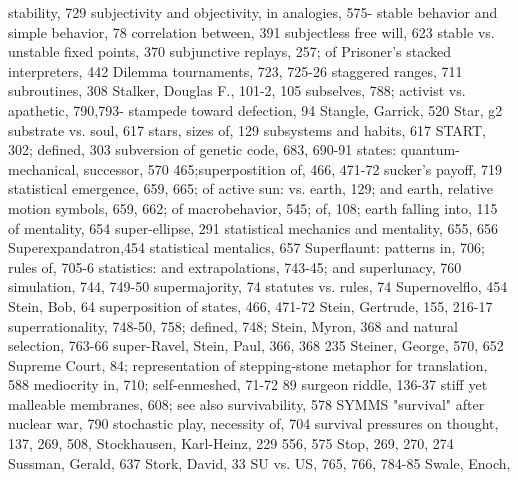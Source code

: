 stability, 729                                  subjectivity and objectivity, in analogies, 575-
stable behavior and simple behavior,             78
 correlation between, 391                       subjectless free will, 623
stable vs. unstable fixed points, 370           subjunctive replays, 257; of Prisoner's
stacked interpreters, 442                        Dilemma tournaments, 723, 725-26
staggered ranges, 711                           subroutines, 308
Stalker, Douglas F., 101-2, 105                 subselves, 788; activist vs. apathetic, 790,793-
stampede toward defection,                       94
Stangle, Garrick, 520 Star, g2                  substrate vs. soul, 617
stars, sizes of, 129                            subsystems and habits, 617
START, 302; defined, 303                        subversion of genetic code, 683, 690-91
states: quantum-mechanical,                     successor, 570
 465;superpostition of, 466, 471-72             sucker's payoff, 719
statistical emergence, 659, 665; of active      sun: vs. earth, 129; and earth, relative motion
 symbols, 659, 662; of macrobehavior, 545;      of, 108; earth falling into, 115
 of mentality, 654                              super-ellipse, 291
statistical mechanics and mentality, 655, 656   Superexpandatron,454
statistical mentalics, 657                      Superflaunt: patterns in, 706; rules of, 705-6
statistics: and extrapolations, 743-45; and     superlunacy, 760
 simulation, 744, 749-50                        supermajority, 74
statutes vs. rules, 74                          Supernovelflo, 454
Stein, Bob, 64                                  superposition of states, 466, 471-72
Stein, Gertrude, 155, 216-17                    superrationality, 748-50, 758; defined, 748;
Stein, Myron, 368                                and natural selection, 763-66 super-Ravel,
Stein, Paul, 366, 368                            235
Steiner, George, 570, 652                       Supreme Court, 84; representation of
stepping-stone metaphor for translation, 588     mediocrity in, 710; self-enmeshed, 71-72
 89                                             surgeon riddle, 136-37
stiff yet malleable membranes, 608; see also    survivability, 578
SYMMS                                           "survival" after nuclear war, 790
stochastic play, necessity of, 704              survival pressures on thought, 137, 269, 508,
Stockhausen, Karl-Heinz, 229                     556, 575
Stop, 269, 270, 274                             Sussman, Gerald, 637
Stork, David, 33                                SU vs. US, 765, 766, 784-85 Swale, Enoch,
